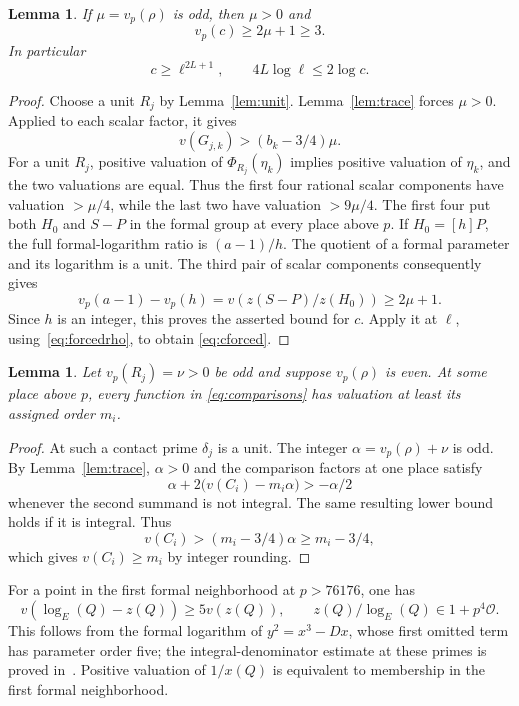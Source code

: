 \documentclass[11pt,a4paper]{article}
\newtheorem{lemma}[theorem]{Lemma}
\begin{document}
\begin{lemma}\label{lem:scalar}
If $\mu=v_p(\rho)$ is odd, then $\mu>0$ and
\[
                           v_p(c)\ge2\mu+1\ge3.
\]
In particular
\begin{equation}\label{eq:cforced}
               c\ge\ell^{2L+1},\qquad 4L\log\ell\le2\log c.
\end{equation}
\end{lemma}
\begin{proof}
Choose a unit $R_j$ by Lemma~\ref{lem:unit}. Lemma~\ref{lem:trace}
forces $\mu>0$. Applied to each scalar factor, it gives
\[
                           v(G_{j,k})>(b_k-3/4)\mu.
\]
For a unit $R_j$, positive valuation of $\Phi_{R_j}(\eta_k)$
implies positive valuation of $\eta_k$, and the two valuations
are equal. Thus the first four rational scalar components have
valuation $>\mu/4$, while the last two have valuation $>9\mu/4$.
The first four put both $H_0$ and $S-P$ in the formal group at
every place above $p$. If $H_0=[h]P$, the full formal-logarithm ratio is
$(a-1)/h$. The quotient of a formal parameter and its logarithm
is a unit. The third pair of scalar components consequently gives
\[
 v_p(a-1)-v_p(h)
       =v(z(S-P)/z(H_0))\ge2\mu+1.
\]
Since $h$ is an integer, this proves the asserted bound for $c$.
Apply it at $\ell$, using~\eqref{eq:forcedrho}, to obtain
\eqref{eq:cforced}.
\end{proof}

\begin{lemma}\label{lem:comparison}
Let $v_p(R_j)=\nu>0$ be odd and suppose $v_p(\rho)$ is even.
At some place above $p$, every function in
\eqref{eq:comparisons} has valuation at least its assigned order $m_i$.
\end{lemma}
\begin{proof}
At such a contact prime $\delta_j$ is a unit. The integer
$\alpha=v_p(\rho)+\nu$ is odd. By Lemma~\ref{lem:trace},
$\alpha>0$ and the comparison factors at one place satisfy
\[
 \alpha+2\bigl(v(C_i)-m_i\alpha\bigr)>-\alpha/2
\]
whenever the second summand is not integral. The same resulting
lower bound holds if it is integral. Thus
\[
                   v(C_i)>(m_i-3/4)\alpha\ge m_i-3/4,
\]
which gives $v(C_i)\ge m_i$ by integer rounding.
\end{proof}

For a point in the first formal neighborhood at $p>76176$, one has
\begin{equation}\label{eq:formal}
 v(\log_E(Q)-z(Q))\ge5v(z(Q)),\qquad
                         z(Q)/\log_E(Q)\in1+p^4\mathcal O.
\end{equation}
This follows from the formal logarithm of $y^2=x^3-Dx$, whose
first omitted term has parameter order five; the integral-denominator
estimate at these primes is proved in~\cite{PointSource,RawSource}.
Positive valuation of $1/x(Q)$ is equivalent to membership in the
first formal neighborhood.
\end{document}
